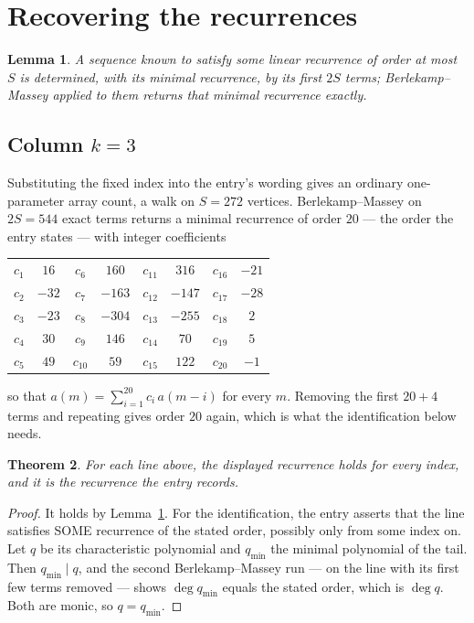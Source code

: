 \documentclass[11pt,a4paper]{article}
\theoremstyle{plain}
\newtheorem{theorem}{Theorem}
\newtheorem{lemma}[theorem]{Lemma}
\theoremstyle{definition}
\begin{document}
\section{Recovering the recurrences}

\begin{lemma}\label{lem:bm}
A sequence known to satisfy some linear recurrence of order at most $S$ is determined, with its
minimal recurrence, by its first $2S$ terms; Berlekamp--Massey applied to them returns that
minimal recurrence exactly.
\end{lemma}

\subsection*{Column $k=3$}
Substituting the fixed index into the entry's wording gives an ordinary one-parameter array
count, a walk on $S=272$ vertices. Berlekamp--Massey on $2S=544$ exact terms
returns a minimal recurrence of order $20$ --- the order the entry states --- with
integer coefficients
\begin{center}\small\begin{tabular}{cccccccc}
$c_{1}$ & $16$ & $c_{6}$ & $160$ & $c_{11}$ & $316$ & $c_{16}$ & $-21$ \\
$c_{2}$ & $-32$ & $c_{7}$ & $-163$ & $c_{12}$ & $-147$ & $c_{17}$ & $-28$ \\
$c_{3}$ & $-23$ & $c_{8}$ & $-304$ & $c_{13}$ & $-255$ & $c_{18}$ & $2$ \\
$c_{4}$ & $30$ & $c_{9}$ & $146$ & $c_{14}$ & $70$ & $c_{19}$ & $5$ \\
$c_{5}$ & $49$ & $c_{10}$ & $59$ & $c_{15}$ & $122$ & $c_{20}$ & $-1$ \\
\end{tabular}\end{center}
so that $a(m)=\sum_{i=1}^{20}c_i\,a(m-i)$ for every $m$. Removing the first
$20+4$ terms and repeating gives order $20$ again, which is what the
identification below needs.

\begin{theorem}
For each line above, the displayed recurrence holds for every index, and it is the recurrence
the entry records.
\end{theorem}

\begin{proof}
It holds by Lemma~\ref{lem:bm}. For the identification, the entry asserts that the line
satisfies SOME recurrence of the stated order, possibly only from some index on. Let $q$ be its
characteristic polynomial and $q_{\min}$ the minimal polynomial of the tail. Then
$q_{\min}\mid q$, and the second Berlekamp--Massey run --- on the line with its first few
terms removed --- shows $\deg q_{\min}$ equals the stated order, which is $\deg q$. Both are
monic, so $q=q_{\min}$.
\end{proof}
\end{document}

